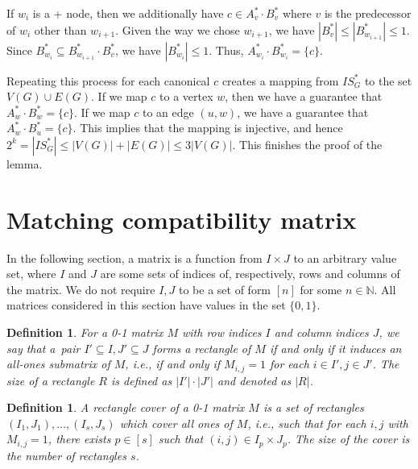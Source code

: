 \documentclass[11pt,a4paper]{article}
\newtheorem{definition}[lemma]{Definition}
\begin{document}
If $w_i$ is a + node, then we additionally have $c \in A_v^* \cdot B_v^*$ where $v$ is the predecessor of $w_i$ other than $w_{i+1}$. Given the way we chose $w_{i+1}$, we have $|B_v^*| \leq |B_{w_{i+1}}^*| \leq 1$. Since $B_{w_i}^* \subseteq B_{w_{i+1}}^* \cdot B_v^*$, we have $|B_{w_i}^*| \leq 1$. Thus, $A_{w_i}^* \cdot B_{w_i}^* = \{c\}$.

Repeating this process for each canonical $c$ creates a mapping from $IS^*_G$ to the set $V(G) \cup E(G)$. If we map $c$ to a vertex $w$, then we have a guarantee that $A_w^* \cdot B_w^* = \{c\}$. If we map $c$ to an edge $(u,w)$, we have a guarantee that $A_w^* \cdot B_u^* = \{c\}$. This implies that the mapping is injective, and hence $2^k = |IS^*_G| \leq |V(G)| + |E(G)| \leq 3|V(G)|$. This finishes the proof of the lemma.





\section{Matching compatibility matrix}
\label{sec:match}

In the following section, a matrix is a function from $I \times J$ to an arbitrary value set, where $I$ and $J$ are some sets of indices of, respectively, rows and columns of the matrix. We do not require $I, J$ to be a set of form $[n]$ for some $n \in \mathbb{N}$. All matrices considered in this section have values in the set $\{0, 1\}$.

\begin{definition}
    For a 0-1 matrix $M$ with row indices $I$ and column indices $J$, we say that a~pair $I' \subseteq I, J' \subseteq J$ forms a \emph{rectangle} of $M$ if and only if it induces an all-ones submatrix of $M$, i.e., if and only if $M_{i,j} = 1$ for each $i \in I', j \in J'$. The \emph{size} of a rectangle $R$ is defined as $|I'| \cdot |J'|$ and denoted as $|R|$.
\end{definition}

\begin{definition}
    A \emph{rectangle cover} of a 0-1 matrix $M$ is a set of rectangles $(I_1, J_1), \dots, (I_s, J_s)$ which cover all ones of $M$, i.e., such that for each $i,j$ with $M_{i,j} = 1$, there exists $p \in [s]$ such that $(i, j) \in I_p \times J_p$. The \emph{size} of the cover is the number of rectangles $s$.
\end{definition}
\end{document}
